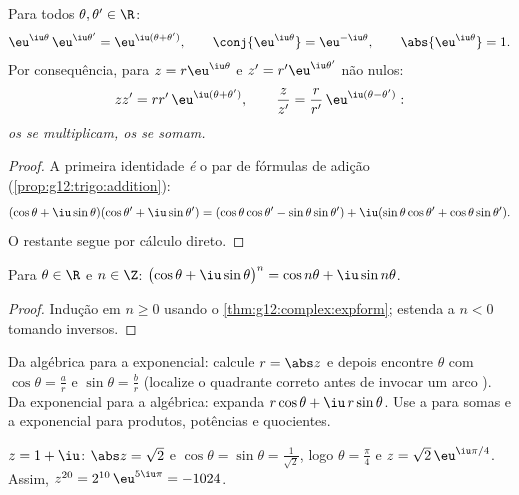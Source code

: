 \begin{theorem}\label{thm:g12:complex:expform}
Para todos $\theta, \theta' \in \R$:
\[
\eu^{\iu\theta}\,\eu^{\iu\theta'} = \eu^{\iu(\theta + \theta')},
\qquad
\conj{\eu^{\iu\theta}} = \eu^{-\iu\theta},
\qquad
\abs{\eu^{\iu\theta}} = 1 .
\]
Por consequência, para $z = r\eu^{\iu\theta}$ e
$z' = r'\eu^{\iu\theta'}$ não nulos:
\[
zz' = rr'\,\eu^{\iu(\theta+\theta')},
\qquad
\frac{z}{z'} = \frac{r}{r'}\,\eu^{\iu(\theta - \theta')} :
\]
\emph{os  se multiplicam, os  se somam.}
\end{theorem}

\begin{proof}
A primeira identidade \emph{é} o par de fórmulas de adição
(\cref{prop:g12:trigo:addition}):
\[
(\cos\theta + \iu\sin\theta)(\cos\theta' + \iu\sin\theta')
= (\cos\theta\cos\theta' - \sin\theta\sin\theta')
+ \iu(\sin\theta\cos\theta' + \cos\theta\sin\theta').
\]
O restante segue por cálculo direto.
\end{proof}

\begin{corollary}\label{cor:g12:complex:demoivre}
Para $\theta \in \R$ e $n \in \Z$:
$\bigl(\cos\theta + \iu\sin\theta\bigr)^n = \cos n\theta + \iu \sin n\theta$.
\end{corollary}

\begin{proof}
Indução em $n \geq 0$ usando o \cref{thm:g12:complex:expform}; estenda a
$n < 0$ tomando inversos.
\end{proof}

\begin{method}\label{met:g12:complex:forms}
Da algébrica para a exponencial: calcule $r = \abs z$ e depois encontre
$\theta$ com $\cos\theta = \frac ar$ e $\sin\theta = \frac br$ (localize o
quadrante correto antes de invocar um arco ). Da exponencial para a
algébrica: expanda $r\cos\theta + \iu\, r\sin\theta$. Use a 
para somas e a exponencial para produtos, potências e quocientes.
\end{method}

\begin{example}
$z = 1 + \iu$: $\abs z = \sqrt2$ e
$\cos\theta = \sin\theta = \frac{1}{\sqrt2}$, logo $\theta = \frac\pi4$ e
$z = \sqrt2\,\eu^{\iu\pi/4}$. Assim,
$z^{20} = 2^{10}\,\eu^{5\iu\pi} = -1024$.
\end{example}

